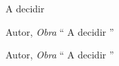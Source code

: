 \documentclass[tcc]{ic}
\begin{document}

\capa

\begin{agradecimentos}

A decidir


\vspace{2em}
\begin{epigraph}{Autor, \textit{Obra}}
`` A decidir ''
\end{epigraph}



\newpage
\thispagestyle{empty}
\vspace*{\fill}
\begin{epigraph}{Autor, \textit{Obra}}
`` A decidir ''
\end{epigraph}

\begin{resumo}


\end{resumo}
\end{agradecimentos}
\end{document}
